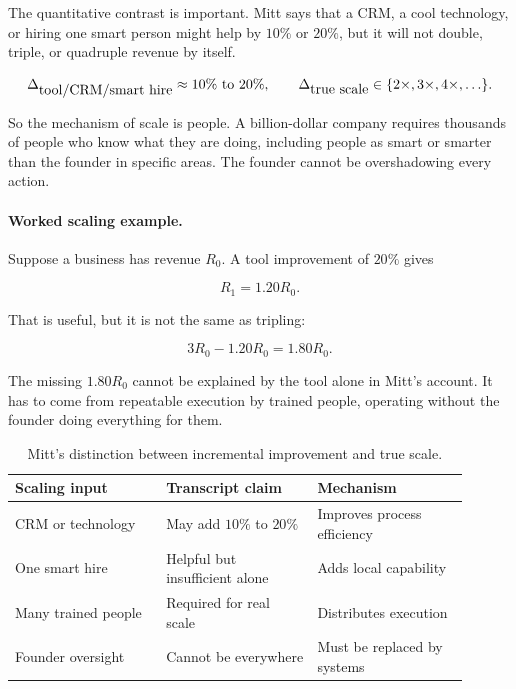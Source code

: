 The quantitative contrast is important. Mitt says that a CRM, a cool technology, or hiring one smart person might help by \(10\%\) or \(20\%\), but it will not double, triple, or quadruple revenue by itself.

\begin{equation}
  \Delta_{\hbox{tool/CRM/smart hire}}
  \approx 10\%\hbox{ to }20\%,
  \qquad
  \Delta_{\hbox{true scale}}
  \in \{2\times,3\times,4\times,\ldots\}.
\end{equation}

So the mechanism of scale is people. A billion-dollar company requires thousands of people who know what they are doing, including people as smart or smarter than the founder in specific areas. The founder cannot be overshadowing every action.

\paragraph{Worked scaling example.}
Suppose a business has revenue \(R_0\). A tool improvement of \(20\%\) gives

\begin{equation}
  R_1 = 1.20R_0.
\end{equation}

That is useful, but it is not the same as tripling:

\begin{equation}
  3R_0 - 1.20R_0 = 1.80R_0.
\end{equation}

The missing \(1.80R_0\) cannot be explained by the tool alone in Mitt's account. It has to come from repeatable execution by trained people, operating without the founder doing everything for them.

\begin{table}
\centering
\begin{tabular}{p{0.30\linewidth}p{0.30\linewidth}p{0.30\linewidth}}
\hline
Scaling input & Transcript claim & Mechanism \\
\hline
CRM or technology & May add \(10\%\) to \(20\%\) & Improves process efficiency \\
One smart hire & Helpful but insufficient alone & Adds local capability \\
Many trained people & Required for real scale & Distributes execution \\
Founder oversight & Cannot be everywhere & Must be replaced by systems \\
\hline
\end{tabular}
\caption{Mitt's distinction between incremental improvement and true scale.}
\end{table}

